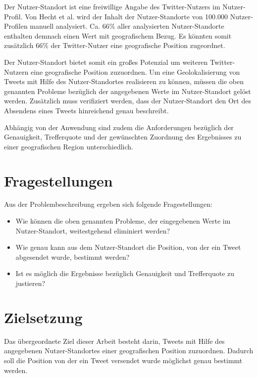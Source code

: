 		Der Nutzer-Standort ist eine freiwillige Angabe des Twitter-Nutzers im Nutzer-Profil. 
		Von Hecht et al. \cite{Hecht2011} wird der Inhalt der Nutzer-Standorte von 100.000 Nutzer-Profilen manuell analysiert.
	    Ca. 66\% aller analysierten Nutzer-Standorte enthalten demnach einen Wert mit geografischem Bezug.
	    Es könnten somit zusätzlich 66\% der Twitter-Nutzer eine geografische Position zugeordnet. 

	    Der Nutzer-Standort bietet somit ein großes Potenzial um weiteren Twitter-Nutzern eine geografische Position zuzuordnen.
	    Um eine Geolokalisierung von Tweets mit Hilfe des Nutzer-Standortes realisieren zu können, müssen die oben genannten Probleme bezüglich der angegebenen Werte im Nutzer-Standort gelöst werden.
	    Zusätzlich muss verifiziert werden, dass der Nutzer-Standort den Ort des Absendens eines Tweets hinreichend genau beschreibt.

	    Abhängig von der Anwendung sind zudem die Anforderungen bezüglich der Genauigkeit, Trefferquote und der gewünschten Zuordnung des Ergebnisses zu einer geografischen Region unterschiedlich. 

	    \newpage

	  \section{Fragestellungen}

	  	Aus der Problembeschreibung ergeben sich folgende Fragestellungen:  

	  	\begin{itemize}
	  		\item Wie können die oben genannten Probleme, der eingegebenen Werte im Nutzer-Standort, weitestgehend eliminiert werden?
	  		\item Wie genau kann aus dem Nutzer-Standort die Position, von der ein Tweet abgesendet wurde, bestimmt werden? 
			\item Ist es möglich die Ergebnisse bezüglich Genauigkeit und Trefferquote zu justieren?
	  	\end{itemize}
		
	\section{Zielsetzung} 

		Das übergeordnete Ziel dieser Arbeit besteht darin, Tweets mit Hilfe des angegebenen Nutzer-Standortes einer geografischen Position zuzuordnen.
		Dadurch soll die Position von der ein Tweet versendet wurde möglichst genau bestimmt werden.

